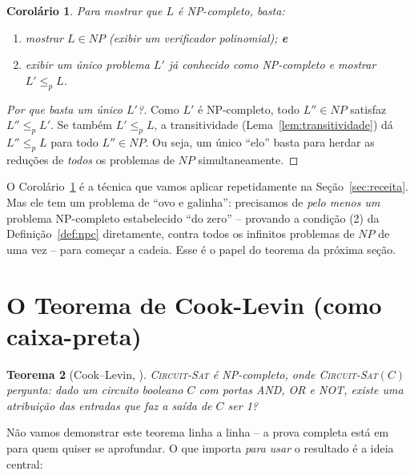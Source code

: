 \documentclass[9pt,a4paper]{extarticle}
\newcommand{\ntc}[1]{\textcolor{notice}{#1}}
\newtheorem{theorem}{Teorema}[section]
\newtheorem{corollary}[theorem]{Corolário}
\theoremstyle{definition}
\begin{document}
\begin{corollary}\label{cor:mostrar-npc}
Para mostrar que \(L\) é NP-completo, basta:
\begin{enumerate}
\item mostrar \(L \in NP\) (exibir um verificador polinomial); \textbf{e}
\item exibir \emph{um único} problema \(L'\) já conhecido como NP-completo e mostrar \(L' \leq_p L\).
\end{enumerate}
\end{corollary}
\begin{proof}[Por que basta um único \(L'\)?]
Como \(L'\) é NP-completo, todo \(L'' \in NP\) satisfaz \(L'' \leq_p L'\). Se também \(L' \leq_p L\), a transitividade (Lema~\ref{lem:transitividade}) dá \(L'' \leq_p L\) para todo \(L'' \in NP\). Ou seja, um único \enquote{elo} basta para herdar as reduções de \emph{todos} os problemas de \(NP\) simultaneamente.
\end{proof}

O Corolário~\ref{cor:mostrar-npc} é a técnica que vamos aplicar repetidamente na Seção~\ref{sec:receita}. Mas ele tem um problema de \enquote{ovo e galinha}: precisamos de \emph{pelo menos um} problema NP-completo estabelecido \enquote{do zero} -- provando a condição (2) da Definição~\ref{def:npc} diretamente, contra todos os infinitos problemas de \(NP\) de uma vez -- para começar a cadeia. Esse é o papel do teorema da próxima seção.

\section{O Teorema de Cook-Levin (como caixa-preta)}\label{sec:cook-levin}

\begin{theorem}[Cook--Levin, \citealp{cook1971}]\label{thm:cook-levin}
\textsc{Circuit-Sat} é NP-completo, onde \textsc{Circuit-Sat}\((C)\) pergunta: dado um circuito booleano \(C\) com portas \emph{AND}, \emph{OR} e \emph{NOT}, existe uma atribuição das entradas que faz a saída de \(C\) ser 1?
\end{theorem}

\ntc{Não vamos demonstrar este teorema linha a linha -- a prova completa está em \citet[Seção 34.3--34.4]{clrs2009} para quem quiser se aprofundar. O que importa \emph{para usar} o resultado é a ideia central:}
\end{document}
